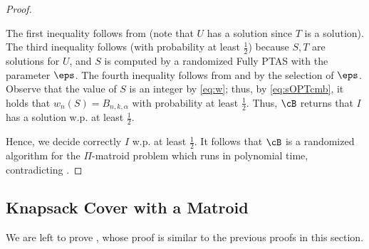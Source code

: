 \begin{proof}
\begin{itemize}
\begin{equation}
			\end{equation} 	The first inequality follows from  (note that $U$ has a solution since $T$ is a solution). %
		The third inequality follows (with probability at least $\frac{1}{2}$) because $S,T$ are solutions for $U$, and $S$ is computed by a randomized Fully PTAS with the parameter $\eps$. The fourth inequality follows from  and by the selection of $\eps$. Observe that the value of $S$ is an integer by \eqref{eq:w}; thus, by \eqref{eq:sOPTcmb}, %
			it holds that $w_n(S) = B_{n,k,\alpha}$ with probability  at least $\frac{1}{2}$. Thus, $\cB$ returns that $I$ has a solution w.p. at least $\frac{1}{2}$.  
		\end{itemize}
		Hence, %
		we decide correctly $I$ w.p. at least $\frac{1}{2}$. %
		It follows that $\cB$ is %
		a randomized algorithm for the $\Pi$-matroid problem which runs in polynomial time, contradicting . 
		
		
		
	\end{proof}
	
	
	\subsection{Knapsack Cover with a Matroid}
	\label{sec:abs_KCM}
	We are left to prove , whose proof is similar to the previous proofs in this section.
	
